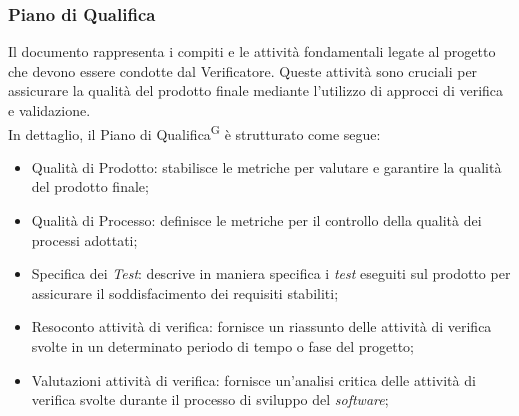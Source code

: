 \documentclass[5pt]{article}
\begin{document}
\subsubsection{Piano di Qualifica}
Il documento rappresenta i compiti e le attività fondamentali legate al progetto che devono essere condotte dal Verificatore. Queste attività sono cruciali per assicurare la qualità del prodotto finale mediante l'utilizzo di approcci di verifica e validazione.\\
In dettaglio, il Piano di Qualifica\textsuperscript{G} è strutturato come segue:
\begin{itemize}
    \item Qualità di Prodotto: stabilisce le metriche per valutare e garantire la qualità del prodotto finale;
    \item Qualità di Processo: definisce le metriche per il controllo della qualità dei processi adottati;
    \item Specifica dei \textit{Test}: descrive in maniera specifica i \textit{test} eseguiti sul prodotto per assicurare il soddisfacimento dei requisiti stabiliti;
    \item Resoconto attività di verifica: fornisce un riassunto delle attività di verifica svolte in un determinato periodo di tempo o fase del progetto;
    \item Valutazioni attività di verifica: fornisce un'analisi critica delle attività di verifica svolte durante il processo di sviluppo del \textit{software};
\end{itemize}
\end{document}
